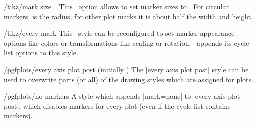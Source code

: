 \begin{key}{/tikz/mark size=}
	This \Tikz\ option allows to set marker sizes to . For circular markers,  is the radius, for other plot marks it is about half the width and height.
\end{key}
\begin{key}{/tikz/every mark}
	This \Tikz\ style can be reconfigured to set marker appearance options like colors or transformations like scaling or rotation. \PGFPlots\ appends its cycle list options to this style.
\begin{codeexample}[]
\end{codeexample}

\begin{codeexample}[]
\end{codeexample}
\end{key}

\begin{stylekey}{/pgfplots/every axis plot post (initially {})}
The |every axis plot post| style can be used to overwrite parts (or all) of the drawing styles which are assigned for plots.
\begin{codeexample}[]
\end{codeexample}
\end{stylekey}

\begin{stylekey}{/pgfplots/no markers}
	A style which appends |mark=none| to |every axis plot post|, which disables markers for every plot (even if the cycle list contains markers). 
\end{stylekey}

